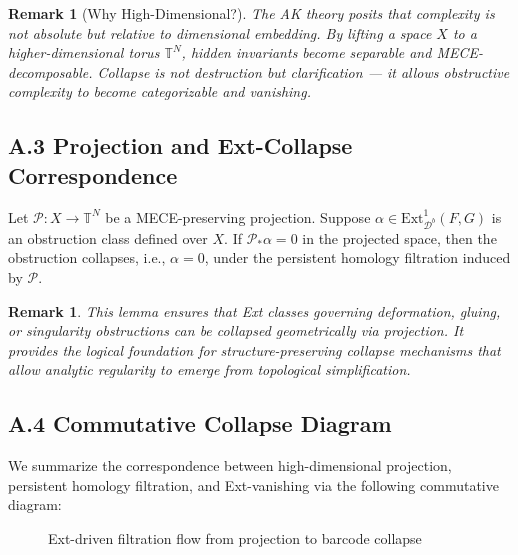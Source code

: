 \documentclass[11pt]{article}
\newtheorem{remark}[theorem]{Remark}
\begin{document}
\begin{remark}[Why High-Dimensional?]
The AK theory posits that complexity is not absolute but relative to dimensional embedding.  
By lifting a space $X$ to a higher-dimensional torus $\mathbb{T}^N$, hidden invariants become separable and MECE-decomposable.  
Collapse is not destruction but clarification — it allows obstructive complexity to become categorizable and vanishing.
\end{remark}

\subsection*{A.3 Projection and Ext-Collapse Correspondence}

\begin{lemma}
Let $\mathcal{P} : X \to \mathbb{T}^N$ be a MECE-preserving projection.  
Suppose $\alpha \in \mathrm{Ext}^1_{\mathcal{D}^b}(F, G)$ is an obstruction class defined over $X$.  
If $\mathcal{P}_\ast \alpha = 0$ in the projected space, then the obstruction collapses, i.e., $\alpha = 0$, under the persistent homology filtration induced by $\mathcal{P}$.
\end{lemma}

\begin{remark}
This lemma ensures that Ext classes governing deformation, gluing, or singularity obstructions can be collapsed geometrically via projection.  
It provides the logical foundation for structure-preserving collapse mechanisms that allow analytic regularity to emerge from topological simplification.
\end{remark}

\subsection*{A.4 Commutative Collapse Diagram}

We summarize the correspondence between high-dimensional projection, persistent homology filtration, and Ext-vanishing via the following commutative diagram:

\begin{figure}[htbp]
\centering
{}
\caption{Ext-driven filtration flow from projection to barcode collapse}
\end{figure}
\end{document}
